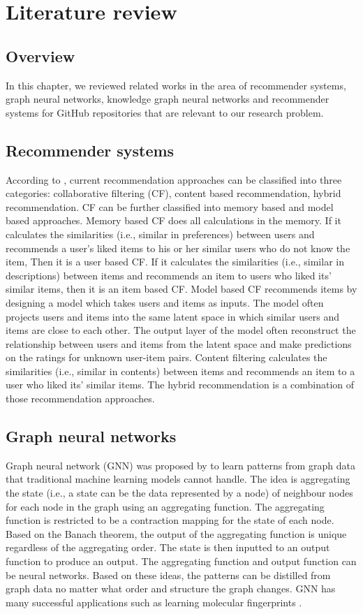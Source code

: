\documentclass[11pt,twoside]{report}
\begin{document}
\chapter{Literature review}
\section{Overview}
In this chapter, we reviewed related works in the area of recommender systems, graph neural networks, knowledge graph neural networks and recommender systems for GitHub repositories that are relevant to our research problem.

\section{Recommender systems}
According to \cite{mansur_review_nodate, park_literature_2012}, current recommendation approaches can be classified into three categories: collaborative filtering (CF), content based recommendation, hybrid recommendation. CF can be further classified into memory based and model based approaches. Memory based CF does all calculations in the memory. If it calculates the similarities (i.e., similar in preferences) between users and recommends a user's liked items to his or her similar users who do not know the item, Then it is a user based CF. If it calculates the similarities (i.e., similar in descriptions) between items and recommends an item to users who liked its' similar items, then it is an item based CF. Model based CF recommends items by designing a model which takes users and items as inputs. The model often projects users and items into the same latent space in which similar users and items are close to each other. The output layer of the model often reconstruct the relationship between users and items from the latent space and make predictions on the ratings for unknown user-item pairs. Content filtering calculates the similarities (i.e., similar in contents) between items and recommends an item to a user who liked its' similar items. The hybrid recommendation is a combination of those recommendation approaches.

\section{Graph neural networks}
Graph neural network (GNN) was proposed by \cite{gori_new_2005, scarselli_graph_2009} to learn patterns from graph data that traditional machine learning models cannot handle. The idea is aggregating the state (i.e., a state can be the data represented by a node) of neighbour nodes for each node in the graph using an aggregating function. The aggregating function is restricted to be a contraction mapping for the state of each node. Based on the Banach theorem, the output of the aggregating function is unique regardless of the aggregating order. The state is then inputted to an output function to produce an output. The aggregating function and output function can be neural networks. Based on these ideas, the patterns can be distilled from graph data no matter what order and structure the graph changes. GNN has many successful applications such as learning molecular fingerprints \cite{duvenaud_convolutional_2015}.
\end{document}
